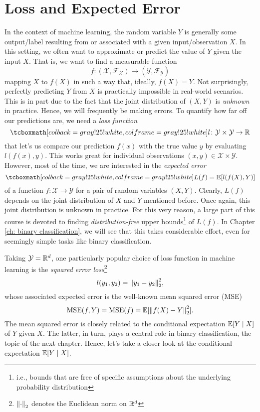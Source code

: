 \section{Loss and Expected Error}

In the context of machine learning, the random variable $Y$ is generally some output/label resulting from or associated with a given input/observation $X$. In this setting, we often want to approximate or predict the value of $Y$ given the input $X$. That is, we want to find a measurable function
\[
    f \colon (\mathcal{X}, \mathcal{F}_{\mathcal{X}}) \to (\mathcal{Y}, \mathcal{F}_{\mathcal{Y}})
\]
mapping $X$ to $f(X)$ in such a way that, ideally, $f(X) = Y$. Not surprisingly, perfectly predicting $Y$ from $X$ is practically impossible in real-world scenarios. This is in part due to the fact that the joint distribution of $(X, Y)$ is \emph{unknown} in practice. Hence, we will frequently be making errors. To quantify how far off our predictions are, we need a \emph{loss function}
\[
    \highlightMath{
        l \colon \mathcal{Y} \times \mathcal{Y} \to \R
    }
\]
that let's us compare our prediction $f(x)$ with the true value $y$ by evaluating $l(f(x), y)$. This works great for individual observations $(x, y) \in \mathcal{X} \times \mathcal{Y}$. However, most of the time, we are interested in the \emph{expected error}
\[
    \highlightMath{
        L(f) = \Exp[l(f(X), Y)]
    }
\]
of a function $f \colon \mathcal{X} \to \mathcal{Y}$ for a pair of random variables $(X, Y)$. Clearly, $L(f)$ depends on the joint distribution of $X$ and $Y$ mentioned before. Once again, this joint distribution is unknown in practice. For this very reason, a large part of this course is devoted to finding \emph{distribution-free} upper bounds\footnote{i.e., bounds that are free of specific assumptions about the underlying probability distribution} of $L(f)$. In Chapter \ref{ch: binary classification}, we will see that this takes considerable effort, even for seemingly simple tasks like binary classification.

Taking $\mathcal{Y} = \mathbb{R}^d$, one particularly popular choice of loss function in machine learning is the \emph{squared error loss}\footnote{$\norm{\cdot}_2$ denotes the Euclidean norm on $\mathbb{R}^d$}
\[
    l(y_1, y_2) = \norm{y_1 - y_2}_2^2,
\]
whose associated expected error is the well-known mean squared error (MSE)
\[
    \operatorname{MSE}(f, Y) = \operatorname{MSE}(f) = \operatorname{\mathbb{E}}[\norm{f(X) - Y}_2^2].
\]
The mean squared error is closely related to the conditional expectation $\operatorname{\mathbb{E}}[Y \mathrel{|} X]$ of $Y$ given $X$. The latter, in turn, plays a central role in binary classification, the topic of the next chapter. Hence, let's take a closer look at the conditional expectation $\operatorname{\mathbb{E}}[Y \mathrel{|} X]$.
